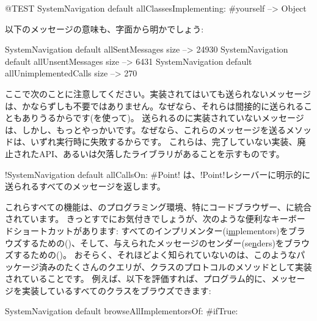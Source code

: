 \documentclass[a4paper,10pt,twoside]{book}
\begin{document}
\begin{code}{@TEST}
SystemNavigation default allClassesImplementing: #yourself --> {Object}
\end{code}

以下のメッセージの意味も、字面から明かでしょう:

\begin{code}{}
SystemNavigation default allSentMessages size          --> 24930
SystemNavigation default allUnsentMessages size      --> 6431
SystemNavigation default allUnimplementedCalls size --> 270
\end{code}

ここで次のことに注意してください。実装されてはいても送られないメッセージは、かならずしも不要ではありません。なぜなら、それらは間接的に送られることもありうるからです(\eg {}を使って)。
送られるのに実装されていないメッセージは、しかし、もっとやっかいです。なぜなら、これらのメッセージを送るメソッドは、いずれ実行時に失敗するからです。
これらは、完了していない実装、廃止されたAPI、あるいは欠落したライブラリがあることを示すものです。

\ct!SystemNavigation default allCallsOn: #Point! は、\ct!Point!レシーバーに明示的に送られるすべてのメッセージを返します。 %

これらすべての機能は、\pharo のプログラミング環境、特にコードブラウザー、に統合されています。
きっとすでにお気付きでしょうが、次のような便利なキーボードショートカットがあります: すべてのインプリメンター(i\underline{m}plementors)をブラウズするための()、そして、与えられたメッセージのセンダー(se\underline{n}ders)をブラウズするための()。
おそらく、それほどよく知られていないのは、このようなパッケージ済みのたくさんのクエリが、クラスのプロトコルのメソッドとして実装されていることです。 %
例えば、以下を評価すれば、プログラム的に、メッセージを実装しているすべてのクラスをブラウズできます:
\begin{code}{}
SystemNavigation default browseAllImplementorsOf: #ifTrue:
\end{code}
\end{document}
